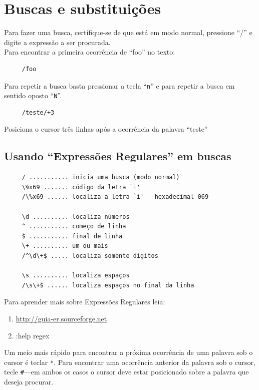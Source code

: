 \documentclass[10pt,a4paper,openany]{book}
\begin{document}
\chapter{Buscas e substituições}\label{Buscas e substituições}

Para fazer uma busca, certifique-se de que está em modo normal,
pressione ``/'' e digite a expressão a ser procurada. \\


Para encontrar a primeira ocorrência de ``foo'' no texto:

\begin{verbatim}
     /foo
\end{verbatim}

Para repetir a busca basta pressionar a tecla ``\verb+n+'' e para
repetir a busca em sentido oposto ``\verb+N+''.

\begin{verbatim}
     /teste/+3
\end{verbatim}

Posiciona o cursor três linhas após a ocorrência da palavra ``teste'' \\


\section{Usando ``Expressões Regulares'' em buscas}

\begin{verbatim}
     / ........... inicia uma busca (modo normal)
     \%x69 ....... código da letra `i'
     /\%x69 ...... localiza a letra `i' - hexadecimal 069
     
     \d .......... localiza números
     ^ ........... começo de linha
     $ ........... final de linha
     \+ .......... um ou mais
     /^\d\+$ ..... localiza somente dígitos
     
     \s .......... localiza espaços
     /\s\+$ ...... localiza espaços no final da linha 
\end{verbatim}

Para aprender mais sobre Expressões Regulares leia:

\begin{enumerate}
  \item \url{http://guia-er.sourceforge.net}
  \item :help regex
\end{enumerate}

Um meio mais rápido para encontrar a próxima ocorrência de uma palavra sob o
cursor é teclar \verb|*|. Para encontrar uma ocorrência anterior da palavra
sob o cursor, tecle \verb|#|---em ambos os casos o cursor deve estar
posicionado sobre a palavra que deseja procurar.
\end{document}
